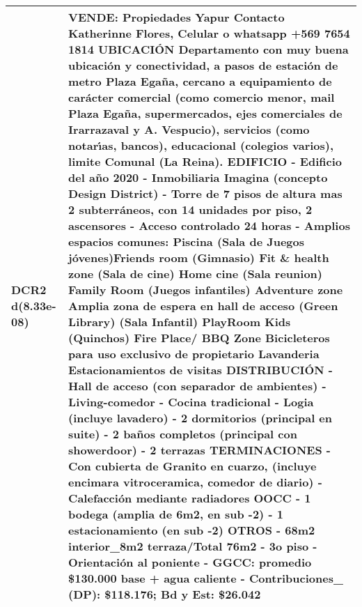 \begin{table}[H]
\begin{tabular}{|l|m{35em}|}
\hline DCR2 d(8.33e-08) & VENDE: Propiedades Yapur Contacto Katherinne Flores, Celular o whatsapp +569 7654 1814  UBICACI\'ON Departamento con muy buena ubicaci\'on y conectividad, a pasos de estaci\'on de metro Plaza Ega\~na, cercano a equipamiento de car\'acter comercial (como comercio menor, mail Plaza Ega\~na, supermercados, ejes comerciales de Irarrazaval y A. Vespucio), servicios (como notar{\'\i}as, bancos), educacional (colegios varios), limite Comunal (La Reina).  EDIFICIO - Edificio del a\~no 2020 - Inmobiliaria Imagina (concepto Design District) - Torre de 7 pisos de altura mas 2 subterr\'aneos, con 14 unidades por piso, 2 ascensores - Acceso controlado 24 horas - Amplios espacios comunes:  Piscina (Sala de Juegos j\'ovenes)Friends room (Gimnasio) Fit \& health zone (Sala de cine) Home cine (Sala reunion) Family Room (Juegos infantiles) Adventure zone Amplia zona de espera en hall de acceso (Green Library) (Sala Infantil) PlayRoom Kids (Quinchos) Fire Place/ BBQ Zone Bicicleteros para uso exclusivo de propietario Lavanderia Estacionamientos de visitas   DISTRIBUCI\'ON - Hall de acceso (con separador de ambientes) - Living-comedor - Cocina tradicional - Logia (incluye lavadero) - 2 dormitorios (principal en suite) - 2 ba\~nos completos (principal con showerdoor) - 2 terrazas  TERMINACIONES - Con cubierta de Granito en cuarzo, (incluye encimara vitroceramica, comedor de diario) - Calefacci\'on mediante radiadores  OOCC - 1 bodega (amplia de 6m2, en sub -2) - 1 estacionamiento (en sub -2)  OTROS - 68m2 interior\_8m2 terraza/Total 76m2 - 3o piso  - Orientaci\'on al poniente - GGCC: promedio \$130.000 base + agua caliente - Contribuciones\_ (DP): \$118.176; Bd y Est: \$26.042 \\
\hline
\end{tabular}
\end{table}
